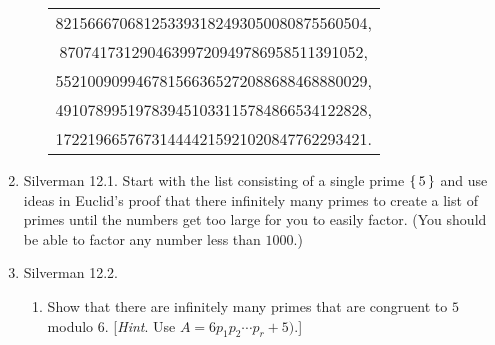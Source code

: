 \documentclass[10pt,twoside]{article}
\begin{document}
\begin{enumerate}[itemsep=2em,label=\Alph*.]
\begin{enumerate}[label=(\alph*)]
                \ttfamily
                \begin{center}
                \begin{tabular}{c}
                    821566670681253393182493050080875560504, 
\\87074173129046399720949786958511391052, 
\\552100909946781566365272088688468880029, 
\\491078995197839451033115784866534122828, 
                    \\172219665767314444215921020847762293421.
                \end{tabular}
                \end{center}
        \rmfamily
        \end{enumerate}
    
    \pagebreak
    \item Silverman 12.1. Start with the list consisting of a single prime $\set{5}$ and use ideas in Euclid's proof that there infinitely many primes to create a list of primes until the numbers get too large for you to easily factor. (You should be able to factor any number less than $1000$.) 
    
    
    \pagebreak
    \item Silverman 12.2.
        \begin{enumerate}[label=(\alph*)]
            \item Show that there are infinitely many primes that are congruent to $5$ modulo $6$. [\textit{Hint}. Use $A=6p_1p_2\cdots p_r + 5)$.]
         \vspace{1em}


\end{enumerate}
\end{enumerate}
\end{document}

